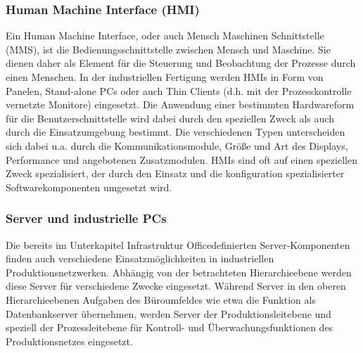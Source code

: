 \subsubsection{Human Machine Interface (HMI)}
Ein Human Machine Interface, oder auch Mensch Maschinen Schnittstelle (MMS), ist die Bedienungsschnittstelle zwischen Mensch und Maschine. Sie dienen daher als Element für die Steuerung und Beobachtung der Prozesse durch einen Menschen. In der industriellen Fertigung werden HMIs in Form von Panelen, Stand-alone PCs oder auch Thin Clients (d.h. mit der Prozesskontrolle vernetzte Monitore) eingesetzt. 
Die Anwendung einer bestimmten Hardwareform für die Benutzerschnittstelle wird dabei durch den speziellen Zweck als auch durch die Einsatzumgebung bestimmt. Die verschiedenen Typen unterscheiden sich dabei u.a. durch die Kommunikationsmodule, Größe und Art des Displays, Performance und angebotenen Zusatzmodulen.
HMIs sind oft auf einen speziellen Zweck spezialisiert, der durch den Einsatz und die konfiguration spezialisierter Softwarekomponenten umgesetzt wird. 

\subsubsection{Server und industrielle PCs}
Die bereits im Unterkapitel \glqq Infrastruktur Office\grqq  definierten Server-Komponenten finden auch verschiedene Einsatzmöglichkeiten in industriellen Produktionsnetzwerken. Abhängig von der betrachteten Hierarchieebene werden diese Server für verschiedene Zwecke eingesetzt. Während Server in den oberen Hierarchieebenen Aufgaben des Büroumfeldes wie etwa die Funktion als Datenbankserver übernehmen, werden Server der Produktionsleitebene und speziell der Prozessleitebene für Kontroll- und Überwachungsfunktionen des Produktionsnetzes eingesetzt. 



